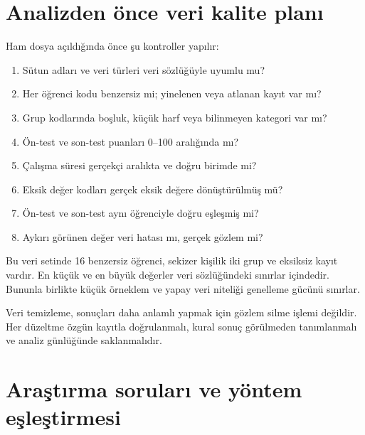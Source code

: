 \section{Analizden önce veri kalite planı}

Ham dosya açıldığında önce şu kontroller yapılır:

\begin{enumerate}
  \item Sütun adları ve veri türleri veri sözlüğüyle uyumlu mu?
  \item Her öğrenci kodu benzersiz mi; yinelenen veya atlanan kayıt var mı?
  \item Grup kodlarında boşluk, küçük harf veya bilinmeyen kategori var mı?
  \item Ön-test ve son-test puanları 0--100 aralığında mı?
  \item Çalışma süresi gerçekçi aralıkta ve doğru birimde mi?
  \item Eksik değer kodları gerçek eksik değere dönüştürülmüş mü?
  \item Ön-test ve son-test aynı öğrenciyle doğru eşleşmiş mi?
  \item Aykırı görünen değer veri hatası mı, gerçek gözlem mi?
\end{enumerate}

Bu veri setinde 16 benzersiz öğrenci, sekizer kişilik iki grup ve eksiksiz
kayıt vardır. En küçük ve en büyük değerler veri sözlüğündeki sınırlar
içindedir. Bununla birlikte küçük örneklem ve yapay veri niteliği genelleme
gücünü sınırlar.

\begin{mistakebox}
Veri temizleme, sonuçları daha anlamlı yapmak için gözlem silme işlemi değildir.
Her düzeltme özgün kayıtla doğrulanmalı, kural sonuç görülmeden tanımlanmalı ve
analiz günlüğünde saklanmalıdır.
\end{mistakebox}

\section{Araştırma soruları ve yöntem eşleştirmesi}

